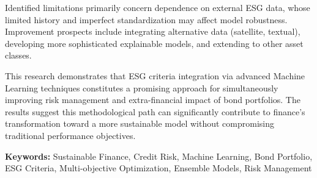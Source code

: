Identified limitations primarily concern dependence on external ESG data, whose limited history and imperfect standardization may affect model robustness. Improvement prospects include integrating alternative data (satellite, textual), developing more sophisticated explainable models, and extending to other asset classes.

This research demonstrates that ESG criteria integration via advanced Machine Learning techniques constitutes a promising approach for simultaneously improving risk management and extra-financial impact of bond portfolios. The results suggest this methodological path can significantly contribute to finance's transformation toward a more sustainable model without compromising traditional performance objectives.

\textbf{Keywords:} Sustainable Finance, Credit Risk, Machine Learning, Bond Portfolio, ESG Criteria, Multi-objective Optimization, Ensemble Models, Risk Management